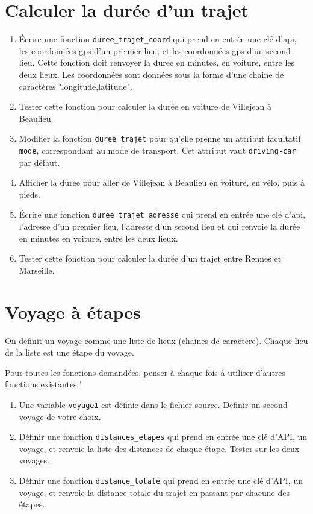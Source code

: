 \documentclass[11pt,a4paper]{article}
\begin{document}
\section{Calculer la durée d'un trajet}

\begin{enumerate}
    \item  Écrire une fonction \verb+duree_trajet_coord+ qui prend en entrée une clé d'api, les coordonnées gps d'un premier lieu, et les coordonnées gps d'un second lieu. Cette fonction doit renvoyer la duree en minutes, en voiture, entre les deux lieux. Les coordonnées sont données sous la forme d'une chaine de caractères "longitude,latitude".
    \item Tester cette fonction pour calculer la durée en voiture de Villejean à Beaulieu.
    \item Modifier la fonction \verb+duree_trajet+ pour qu'elle prenne un attribut facultatif \verb+mode+, correspondant au mode de transport. Cet attribut vaut \verb+driving-car+ par défaut.
    
    \item Afficher la duree pour aller de Villejean à Beaulieu en voiture, en vélo, puis à pieds.
    \item Écrire une fonction \verb+duree_trajet_adresse+ qui prend en entrée une clé d'api, l'adresse d'un premier lieu, l'adresse d'un second lieu et qui renvoie la durée  en minutes en voiture, entre les deux lieux. 
    \item Tester cette fonction pour calculer la durée d'un trajet entre Rennes et Marseille.
    
\end{enumerate}

\section{Voyage à étapes}
On définit un voyage comme une liste de lieux (chaines de caractère). Chaque lieu de la liste est une étape du voyage.

Pour toutes les fonctions demandées, penser à chaque fois à utiliser d'autres fonctions existantes !

\begin{enumerate}
    \item Une variable \verb+voyage1+ est définie dans le fichier source. Définir un second voyage de votre choix.
    \item Définir une fonction \verb+distances_etapes+ qui prend en entrée une clé d'API, un voyage, et renvoie la liste des distances de chaque étape. Tester sur les deux voyages.
    \item Définir une fonction \verb+distance_totale+ qui prend en entrée une clé d'API, un voyage, et renvoie la distance totale du trajet en passant par chacune des étapes.
\end{enumerate}
\end{document}
